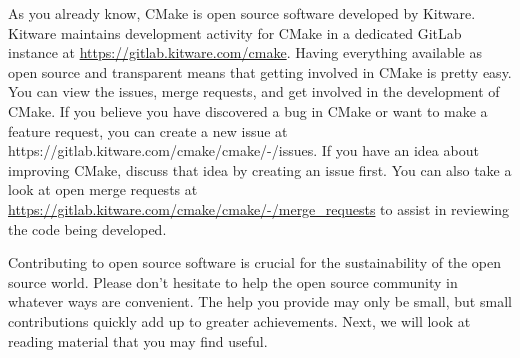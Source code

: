 As you already know, CMake is open source software developed by Kitware. Kitware maintains development activity for CMake in a dedicated GitLab instance at \url{https://gitlab.kitware.com/cmake}. Having everything available as open source and transparent means that getting involved in CMake is pretty easy. You can view the issues, merge requests, and get involved in the development of CMake. If you believe you have discovered a bug in CMake or want to make a feature request, you can create a new issue at https://gitlab.kitware.com/cmake/cmake/-/issues. If you have an idea about improving CMake, discuss that idea by creating an issue first. You can also take a look at open merge requests at \url{https://gitlab.kitware.com/cmake/cmake/-/merge_requests} to assist in reviewing the code being developed.

Contributing to open source software is crucial for the sustainability of the open source world. Please don't hesitate to help the open source community in whatever ways are convenient. The help you provide may only be small, but small contributions quickly add up to greater achievements. Next, we will look at reading material that you may find useful.
